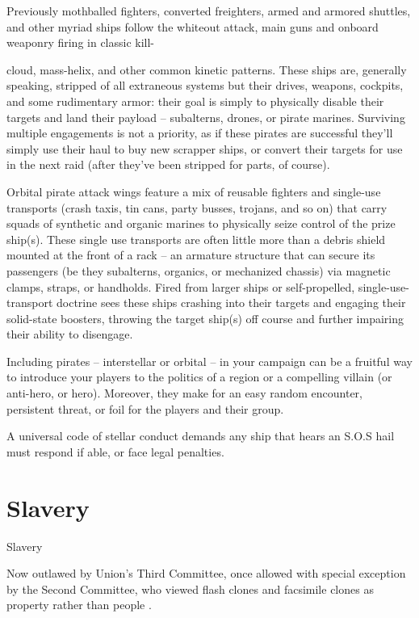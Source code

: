 Previously mothballed fighters, converted freighters, armed and armored shuttles, and other
myriad ships follow the whiteout attack, main guns and onboard weaponry firing in classic kill-




cloud, mass-helix, and other common kinetic patterns. These ships are, generally speaking,
stripped of all extraneous systems but their drives, weapons, cockpits, and some rudimentary
armor: their goal is simply to physically disable their targets and land their payload -- subalterns,
drones, or pirate marines. Surviving multiple engagements is not a priority, as if these pirates are
successful they’ll simply use their haul to buy new scrapper ships, or convert their targets for use
in the next raid (after they’ve been stripped for parts, of course).

Orbital pirate attack wings feature a mix of reusable fighters and single-use transports (crash
taxis, tin cans, party busses, trojans, and so on) that carry squads of synthetic and organic
marines to physically seize control of the prize ship(s). These single use transports are often little
more than a debris shield mounted at the front of a rack -- an armature structure that can secure
its passengers (be they subalterns, organics, or mechanized chassis) via magnetic clamps,
straps, or handholds. Fired from larger ships or self-propelled, single-use-transport doctrine sees
these ships crashing into their targets and engaging their solid-state boosters, throwing the target
ship(s) off course and further impairing their ability to disengage.

Including pirates -- interstellar or orbital -- in your campaign can be a fruitful way to introduce your
players to the politics of a region or a compelling villain (or anti-hero, or hero). Moreover, they
make for an easy random encounter, persistent threat, or foil for the players and their group.

A universal code of stellar conduct demands any ship that hears an S.O.S hail must respond if
able, or face legal penalties.

\section{Slavery}
Slavery

Now outlawed by Union’s Third Committee, once allowed with special exception by the Second
Committee, who viewed flash clones and facsimile clones as property rather than people .


